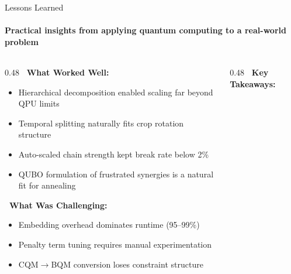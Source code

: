 \documentclass[aspectratio=169,10pt]{beamer}
\begin{document}
\begin{frame}{Lessons Learned}
    \framesubtitle{Practical insights from applying quantum computing to a real-world problem}
    \vspace{-0.3cm}

    \begin{columns}[T]
        \begin{column}{0.48\textwidth}
            \small\textbf{\textcolor{accentGreen}{\faCheckCircle}\ What Worked Well:}
            \begin{itemize}\small
                \item Hierarchical decomposition enabled scaling far beyond QPU limits
                \item Temporal splitting naturally fits crop rotation structure
                \item Auto-scaled chain strength kept break rate below 2\%
                \item QUBO formulation of frustrated synergies is a natural fit for annealing
            \end{itemize}

            \vspace{0.3cm}
            \small\textbf{\textcolor{alertRed}{\faTimesCircle}\ What Was Challenging:}
            \begin{itemize}\small
                \item Embedding overhead dominates runtime (95--99\%)
                \item Penalty term tuning requires manual experimentation
                \item CQM$\to$BQM conversion loses constraint structure
            \end{itemize}
        \end{column}

        \begin{column}{0.48\textwidth}
            \small\textbf{\textcolor{primaryBlue}{\faLightbulb}\ Key Takeaways:}
            \vspace{0.2cm}


\end{column}
\end{columns}
\end{frame}
\end{document}
